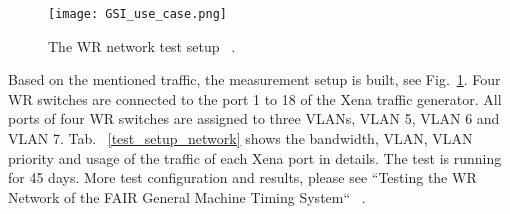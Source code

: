 \begin{figure}[H]
   \centering   
   \texttt{[image: GSI\_use\_case.png]}
   \caption{The WR network test setup ~\cite{prados_testing_2016}.}
   \label{GSI_use_case.jpg}
\end{figure}
Based on the mentioned traffic, the measurement setup is built, see Fig.~\ref{GSI_use_case.jpg}. Four WR switches are connected to the port 1 to 18 of the Xena traffic generator. All ports of four WR switches are assigned to three VLANs, VLAN 5, VLAN 6 and VLAN 7. Tab. ~\ref{test_setup_network} shows the bandwidth, VLAN, VLAN priority and usage of the traffic of each Xena port in details. The test is running for 45 days. More test configuration and results, please see ``Testing the WR Network of the FAIR General Machine Timing System`` ~\cite{prados_testing_2016}.
\renewcommand{\multirowsetup}{\centering} 
